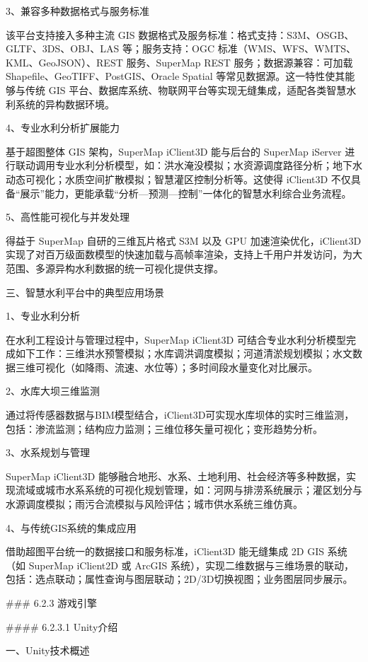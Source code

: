 3、兼容多种数据格式与服务标准

该平台支持接入多种主流 GIS 数据格式及服务标准：格式支持：S3M、OSGB、GLTF、3DS、OBJ、LAS 等；服务支持：OGC 标准（WMS、WFS、WMTS、KML、GeoJSON）、REST 服务、SuperMap REST 服务；数据源兼容：可加载 Shapefile、GeoTIFF、PostGIS、Oracle Spatial 等常见数据源。这一特性使其能够与传统 GIS 平台、数据库系统、物联网平台等实现无缝集成，适配各类智慧水利系统的异构数据环境。

4、专业水利分析扩展能力

基于超图整体 GIS 架构，SuperMap iClient3D 能与后台的 SuperMap iServer 进行联动调用专业水利分析模型，如：洪水淹没模拟；水资源调度路径分析；地下水动态可视化；水质空间扩散模拟；智慧灌区控制分析等。这使得 iClient3D 不仅具备``展示''能力，更能承载``分析---预测---控制''一体化的智慧水利综合业务流程。

5、高性能可视化与并发处理

得益于 SuperMap 自研的三维瓦片格式 S3M 以及 GPU 加速渲染优化，iClient3D 实现了对百万级面数模型的快速加载与高帧率渲染，支持上千用户并发访问，为大范围、多源异构水利数据的统一可视化提供支撑。

三、智慧水利平台中的典型应用场景

1、专业水利分析

在水利工程设计与管理过程中，SuperMap iClient3D 可结合专业水利分析模型完成如下工作：三维洪水预警模拟；水库调洪调度模拟；河道清淤规划模拟；水文数据三维可视化（如降雨、流速、水位等）；多时间段水量变化对比展示。

2、水库大坝三维监测

通过将传感器数据与BIM模型结合，iClient3D可实现水库坝体的实时三维监测，包括：渗流监测；结构应力监测；三维位移矢量可视化；变形趋势分析。

3、水系规划与管理

SuperMap iClient3D 能够融合地形、水系、土地利用、社会经济等多种数据，实现流域或城市水系系统的可视化规划管理，如：河网与排涝系统展示；灌区划分与水源调度模拟；雨污合流模拟与风险评估；城市供水系统三维仿真。

4、与传统GIS系统的集成应用

借助超图平台统一的数据接口和服务标准，iClient3D 能无缝集成 2D GIS 系统（如 SuperMap iClient2D 或 ArcGIS 系统），实现二维数据与三维场景的联动，包括：选点联动；属性查询与图层联动；2D/3D切换视图；业务图层同步展示。

\#\#\# 6.2.3 游戏引擎

\#\#\#\# 6.2.3.1 Unity介绍

一、Unity技术概述

